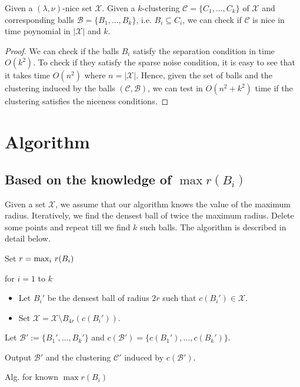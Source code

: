 \documentclass[11pt]{article}
\newcommand{\mc}{\mathcal}
\newenvironment{alg}{
    \begin{list}{}{
        \setlength{\itemsep}{2pt}
        \setlength{\parsep}{0pt}
        \setlength{\parskip}{0pt}
        \setlength{\topsep}{1pt}
    }
}
{
    \end{list}
}
\begin{document}
\begin{lemma}
\label{lemma:chknice}
Given a $(\lambda,\nu)$-nice set $\mc X$. Given a $k$-clustering $\mc C = \{C_1,\ldots,C_k\}$ of $\mc X$ and corresponding balls $\mc B = \{B_1,\ldots,B_k\}$, i.e. $B_i \subseteq C_i$, we can check if $\mc C$ is nice in time poynomial in $|\mc X|$ and $k$.
\end{lemma}
\begin{proof}
We can check if the balls $B_i$ satisfy the separation condition in time $O(k^2)$. To check if they satisfy the sparse noise condition, it is easy to see that it takes time $O(n^2)$ where $n = |\mathcal{X}|$. Hence, given the set of balls and the clustering induced by the balls $(\mc C,\mc B)$, we can test in $O(n^2+k^2)$ time if the clustering satisfies the niceness conditions.
\end{proof}

\section{Algorithm}
\subsection{Based on the knowledge of $\max r(B_i)$}
Given a set $\mc X$, we assume that our algorithm knows the value of the maximum radius. Iteratively, we find the densest ball of twice the maximum radius. Delete some points and repeat till we find $k$ such balls. The algorithm is described in detail below.

\begin{algorithm}
\begin{alg}
	\item[] Set $r = \max_i \thinspace r(B_i)$
	\item[] for $i=1$ to $k$
	\begin{itemize}
		\item[] Let $B_i'$ be the densest ball of radius $2r$ such that $c(B_i') \in \mathcal{X}$.
		\item[] Set $\mc X=\mc X\setminus B_{4r}(c(B_i'))$. 
	\end{itemize}
\item[] Let $\mc B' := \{B_1',\ldots,B_k'\}$ and $c(\mc B') = \{c(B_1'),\ldots,c(B_k')\}$.
\item[] Output $\mc B'$ and the clustering $\mc C'$ induced by $c(\mc B')$.
\label{alg:NotKnown}
\end{alg}
\caption{Alg. for known $\max{r(B_i)}$}
\end{algorithm}
\end{document}
